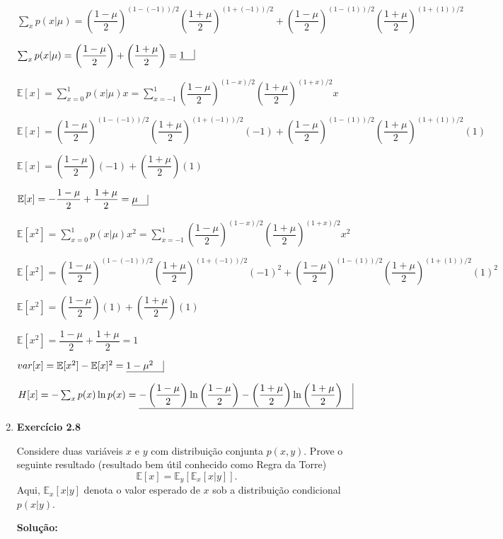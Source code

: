 \begin{enumerate}

$\sum_x p(x|\mu) = \left(\dfrac{1-\mu}{2}\right)^{(1-(-1))/2}\left(\dfrac{1+\mu}{2}\right)^{(1+(-1))/2} + \left(\dfrac{1-\mu}{2}\right)^{(1-(1))/2}\left(\dfrac{1+\mu}{2}\right)^{(1+(1))/2} $

$\sum_x p(x|\mu) = \left(\dfrac{1-\mu}{2}\right) + \left(\dfrac{1+\mu}{2}\right)  = \underline{ 1 \quad} \rule[-0.4ex]{0.4pt}{2.5ex} $


$\mathbb{E}[x] = \sum_{x=0}^{1} p(x|\mu) x =  \sum_{x=-1}^{1} \left(\dfrac{1-\mu}{2}\right)^{(1-x)/2}\left(\dfrac{1+\mu}{2}\right)^{(1+x)/2}  x$

$\mathbb{E}[x] = \left(\dfrac{1-\mu}{2}\right)^{(1-(-1))/2}\left(\dfrac{1+\mu}{2}\right)^{(1+(-1))/2}(-1) + \left(\dfrac{1-\mu}{2}\right)^{(1-(1))/2}\left(\dfrac{1+\mu}{2}\right)^{(1+(1))/2} (1) $

$\mathbb{E}[x] = \left(\dfrac{1-\mu}{2}\right)(-1) + \left(\dfrac{1+\mu}{2}\right)(1) $

$\mathbb{E}[x] = - \dfrac{1-\mu}{2} + \dfrac{1+\mu}{2} = \underline{ \mu \quad} \rule[-0.8ex]{0.4pt}{2.5ex} $


$\mathbb{E}[x^2] = \sum_{x=0}^{1} p(x|\mu) x^2 =  \sum_{x=-1}^{1} \left(\dfrac{1-\mu}{2}\right)^{(1-x)/2}\left(\dfrac{1+\mu}{2}\right)^{(1+x)/2}  x^2$

$\mathbb{E}[x^2] = \left(\dfrac{1-\mu}{2}\right)^{(1-(-1))/2}\left(\dfrac{1+\mu}{2}\right)^{(1+(-1))/2}(-1)^2 + \left(\dfrac{1-\mu}{2}\right)^{(1-(1))/2}\left(\dfrac{1+\mu}{2}\right)^{(1+(1))/2} (1)^2 $

$\mathbb{E}[x^2] = \left(\dfrac{1-\mu}{2}\right)(1) + \left(\dfrac{1+\mu}{2}\right)(1) $

$\mathbb{E}[x^2] = \dfrac{1-\mu}{2} + \dfrac{1+\mu}{2} =  1$


$ var[x] = \mathbb{E}[x^2] - \mathbb{E}[x]^2 = \underline{ 1 - \mu^2 \quad} \vline $


$H[x] = -\sum_x p(x) \ln p(x) =  \underline{  - \left(\dfrac{1-\mu}{2}\right) \ln \left(\dfrac{1-\mu}{2}\right) - \left(\dfrac{1+\mu}{2}\right) \ln \left(\dfrac{1+\mu}{2}\right) \quad} \vline$





\item \textbf{Exercício 2.8}\par
Considere duas variáveis $x$ e $y$ com distribuição conjunta $p(x,y)$. Prove o seguinte resultado (resultado bem útil conhecido como Regra da Torre)
\begin{equation*}
    \mathbb{E}[x] = \mathbb{E}_y[\mathbb{E}_x[x|y]].
\end{equation*}
Aqui, $\mathbb{E}_x[x|y]$ denota o valor esperado de $x$ sob a distribuição condicional $p(x|y)$.
\par
\textbf{Solução:}


\end{enumerate}
